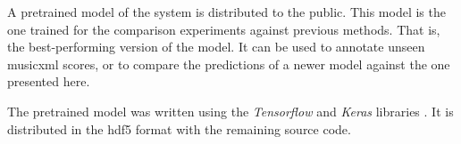 
A pretrained model of the system is distributed to the
public. This model is the one trained for the comparison
experiments against previous methods. That is, the
best-performing version of the model. It can be used to
annotate unseen \gls{musicxml} scores, or to compare the
predictions of a newer model against the one presented here.

The pretrained model was written using the \emph{Tensorflow}
and \emph{Keras} libraries \parencite{abadi2016tensorflow,
chollet2021deep}. It is distributed in the \gls{hdf5} format
with the remaining source
code. 
